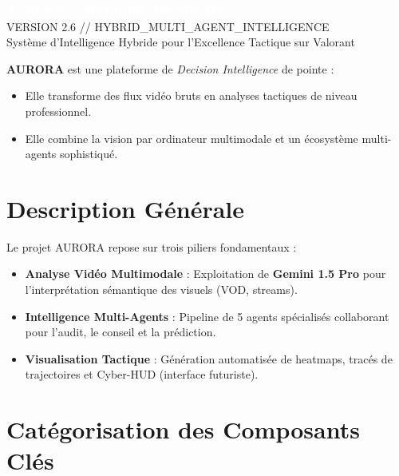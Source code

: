 \documentclass[11pt,a4paper]{article}
\begin{document}
\begin{tcolorbox}[
    colback=darkbg,
    colframe=aurorablue!50,
    arc=0mm,
    boxrule=0pt,
    bottomrule=3pt,
    left=20pt,
    right=20pt,
    top=30pt,
    bottom=30pt
]
    \centering
    \textcolor{white}{\sffamily\Huge\bfseries AURORA // RAPPORT DE PROJET} \\
    \vspace{0.8em}
    \textcolor{auroracyl}{\sffamily\large VERSION 2.6 // HYBRID_MULTI_AGENT_INTELLIGENCE} \\
    \vspace{1.5em}
    \textcolor{white!80}{\sffamily\small Système d'Intelligence Hybride pour l'Excellence Tactique sur Valorant}
\end{tcolorbox}

\vspace{3em}

\noindent \textbf{AURORA} est une plateforme de \textit{Decision Intelligence} de pointe :
\begin{itemize}[label=\textcolor{auroracyl}{\tiny{}}]
    \item Elle transforme des flux vidéo bruts en analyses tactiques de niveau professionnel.
    \item Elle combine la vision par ordinateur multimodale et un écosystème multi-agents sophistiqué.
\end{itemize}

\section{Description Générale}
Le projet AURORA repose sur trois piliers fondamentaux :
\begin{itemize}[label=\textcolor{auroracyl}{$\blacktriangleright$}]
    \item \textbf{Analyse Vidéo Multimodale} : Exploitation de \textbf{Gemini 1.5 Pro} pour l'interprétation sémantique des visuels (VOD, streams).
    \item \textbf{Intelligence Multi-Agents} : Pipeline de 5 agents spécialisés collaborant pour l'audit, le conseil et la prédiction.
    \item \textbf{Visualisation Tactique} : Génération automatisée de heatmaps, tracés de trajectoires et Cyber-HUD (interface futuriste).
\end{itemize}

\section{Catégorisation des Composants Clés}
\end{document}
